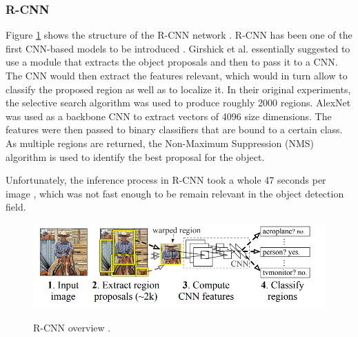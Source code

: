 \FloatBarrier

\subsubsection{R-CNN}

Figure \ref{rcnn} shows the structure of the R-CNN network \cite{Girshick2013}. R-CNN has been one of the first CNN-based models to be introduced \cite{Zaidi2021}. Girshick et al. essentially suggested to use a module that extracts the object proposals and then to pass it to a CNN. The CNN would then extract the features relevant, which would in turn allow to classify the proposed region as well as to localize it. In their original experiments, the selective search algorithm  \cite{Uijlings13} was used to produce roughly 2000 regions. AlexNet  \cite{NIPS2012_c399862d} was used as a backbone CNN to extract vectors of 4096 size dimensions. The features were then passed to binary classifiers that are bound to a certain class. As multiple regions are returned, the Non-Maximum Suppression (NMS) algorithm \cite{Hosang2017} is used to identify the best proposal for the object. 

Unfortunately, the inference process in R-CNN took a whole 47 seconds per image \cite{Girshick2013}, which was not fast enough to be remain relevant in the object detection field. 

\begin{figure}[htb]
	\begin{center}
		\includegraphics[width=12cm]{./rcnn.png}
	\end{center}
	\caption{R-CNN overview \cite{Girshick2013}.}
	\begin{center}
		\label{rcnn}
	\end{center}
\end{figure}
\FloatBarrier


